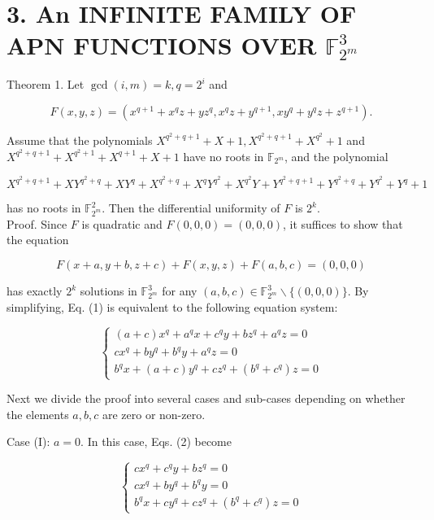 \documentclass[10pt]{article}
\begin{document}
\section*{3. An INFINITE FAMILY OF APN FUNCTIONS OVER $\mathbb{F}_{2^{m}}^{3}$}
Theorem 1. Let $\operatorname{gcd}(i, m)=k, q=2^{i}$ and

$$
F(x, y, z)=\left(x^{q+1}+x^{q} z+y z^{q}, x^{q} z+y^{q+1}, x y^{q}+y^{q} z+z^{q+1}\right) .
$$

Assume that the polynomials $X^{q^{2}+q+1}+X+1, X^{q^{2}+q+1}+X^{q^{2}}+1$ and $X^{q^{2}+q+1}+X^{q^{2}+1}+X^{q+1}+X+1$ have no roots in $\mathbb{F}_{2^{m}}$, and the polynomial

$$
X^{q^{2}+q+1}+X Y^{q^{2}+q}+X Y^{q}+X^{q^{2}+q}+X^{q} Y^{q^{2}}+X^{q^{2}} Y+Y^{q^{2}+q+1}+Y^{q^{2}+q}+Y^{q^{2}}+Y^{q}+1
$$

has no roots in $\mathbb{F}_{2^{m}}^{2}$. Then the differential uniformity of $F$ is $2^{k}$.\\
Proof. Since $F$ is quadratic and $F(0,0,0)=(0,0,0)$, it suffices to show that the equation


\begin{equation*}
F(x+a, y+b, z+c)+F(x, y, z)+F(a, b, c)=(0,0,0) \tag{1}
\end{equation*}


has exactly $2^{k}$ solutions in $\mathbb{F}_{2^{m}}^{3}$ for any $(a, b, c) \in \mathbb{F}_{2^{m}}^{3} \backslash\{(0,0,0)\}$. By simplifying, Eq. (1) is equivalent to the following equation system:

\[
\left\{\begin{array}{l}
(a+c) x^{q}+a^{q} x+c^{q} y+b z^{q}+a^{q} z=0  \tag{2.1}\\
c x^{q}+b y^{q}+b^{q} y+a^{q} z=0 \\
b^{q} x+(a+c) y^{q}+c z^{q}+\left(b^{q}+c^{q}\right) z=0
\end{array}\right.
\]

Next we divide the proof into several cases and sub-cases depending on whether the elements $a, b, c$ are zero or non-zero.

Case (I): $a=0$. In this case, Eqs. (2) become

\[
\left\{\begin{array}{l}
c x^{q}+c^{q} y+b z^{q}=0  \tag{3.1}\\
c x^{q}+b y^{q}+b^{q} y=0 \\
b^{q} x+c y^{q}+c z^{q}+\left(b^{q}+c^{q}\right) z=0
\end{array}\right.
\]
\end{document}
